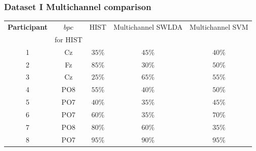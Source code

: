 \documentclass[aspectratio=169]{beamer}
\begin{document}
\begin{frame}
\frametitle{Dataset I Multichannel comparison}
\begin{center}
\begin{table}[h!]
\centering
\begin{tabular}{c|cc|c|c}
\toprule
\textbf{Participant}	&  $bpc$	&  HIST & Multichannel SWLDA & Multichannel SVM \\
                                    &  for HIST        &           &                                       &   \\
\midrule
1     &     Cz   &   $35\%$  & $45\%$  & $40\%$\\
2     &     Fz   &   $85\%$  & $30\%$   & $50\%$   \\
3     &     Cz   &   $25\%$  & $65\%$ & $55\%$   \\
4     &     PO8 &   $55\%$ & $40\%$  & $50\%$   \\
5     &     PO7 &   $40\%$ & $35\%$  & $45\%$   \\
6     &     PO7 &   $60\%$ &  $35\%$  & $70\%$   \\
7     &     PO8 &   $80\%$ & $60\%$   & $35\%$   \\
8     &     PO7 &   $95\%$  & $90\%$   & $95\%$  \\

\end{tabular}
\label{tab:resultsalsswlda}
\end{table}
\end{center}
\end{frame} 
\end{document}
